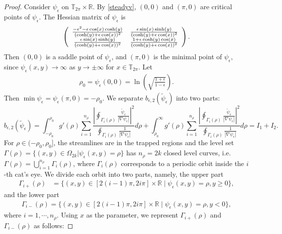\documentclass[1 [leqno, 11pt]{amsart}
\numberwithin{equation}{section}
\let\ep=\epsilon
\begin{document}
\begin{CJK*}{GBK}{song}
\begin{proof}
 Consider $\psi_\ep$ on $\mathbb{T}_{2\pi}\times \mathbb{R}$.
By \eqref{steadyv}, $(0,0)$ and $(\pi,0)$ are critical points of $\psi_\ep$. The  Hessian matrix of $\psi_\ep$ is
\begin{align*}
\left( \begin{array}{cc} {-\ep^2-\ep\cos(x)\cosh(y)\over (\cosh(y)+\ep\cos(x))^2} & {\ep\sin(x)\sinh(y)\over (\cosh(y)+\ep\cos(x))^2} \\ {\ep\sin(x)\sinh(y)\over (\cosh(y)+\ep\cos(x))^2} & {1+\ep\cosh(y)\cos(x)\over (\cosh(y)+\ep\cos(x))^2} \end{array} \right).
\end{align*}
Then $(0,0)$ is a saddle point of $\psi_\ep$, and $(\pi,0)$ is the minimal  point of $\psi_\ep$, since $\psi_\ep(x,y)\to\infty$ as $y\to \pm\infty$ for $x\in\mathbb{T}_{2\pi}$.
Let
\begin{align}\label{def-rho0}
\rho_0 = \psi_\ep(0,0) = \ln\left(\sqrt{\frac{1+\ep}{1-\ep}}\right).
\end{align}
Then $\min \psi_\ep = \psi_\ep(\pi, 0) = - \rho_0$. We separate $b_{\ep, 2}(\tilde{\psi}_\ep)$ into two parts:
$$b_{\ep, 2}(\tilde{\psi}_\ep) =\int_{-\rho_0}^{\rho_0} g'(\rho) \sum_{i=1}^{n_\rho} \frac{\left|\oint_{\Gamma_i (\rho)} \frac{\tilde{\psi}_\ep}{|\nabla \psi_\ep|}\right|^2}{\oint_{\Gamma_i (\rho)} \frac{1}{|\nabla \psi_\ep|}} d\rho +\int_{\rho_0}^{\infty} g'(\rho) \sum_{i=1}^{n_\rho} \frac{\left|\oint_{\Gamma_i (\rho)} \frac{\tilde{\psi}_\ep}{|\nabla \psi_\ep|}\right|^2}{\oint_{\Gamma_i (\rho)} \frac{1}{|\nabla \psi_\ep|}} d\rho= I_1 + I_2. $$
For $\rho\in(-\rho_0, \rho_0]$, the streamlines are in the trapped regions and  the level set $\Gamma(\rho) = \{(x, y) \in \Omega_{2k} | \psi_\ep(x,y) = \rho\} $ has $n_\rho = 2k$ closed level curves, i.e. $\Gamma(\rho) =  \bigcup_{i=1}^{n_\rho} \Gamma_i(\rho)$, where $\Gamma_i(\rho)$ corresponds to a periodic orbit inside the $i$-th cat's eye. We divide each orbit into two parts, namely, the upper part
\begin{align}\label{curve-Gamma-i+rho1}
\Gamma_{i+} (\rho)
& = \{(x, y) \in [2(i-1)\pi, 2i\pi] \times \mathbb{R}  \;|\;  \psi_\ep(x,y) = \rho,  y \geq 0\},
\end{align}
and the lower part
\begin{align}\label{curve-Gamma-i+rho2}\Gamma_{i-} (\rho) = \{(x, y) \in [2(i-1)\pi, 2i\pi] \times \mathbb{R}\;|\;  \psi_\ep(x,y) = \rho,  y < 0\},\end{align}
where $i = 1, \cdots, n_\rho$. Using $x$ as the parameter,
we  represent $\Gamma_{i+}(\rho)$ and $\Gamma_{i-}(\rho)$ as follows:

\end{proof}
\end{CJK*}
\end{document}
